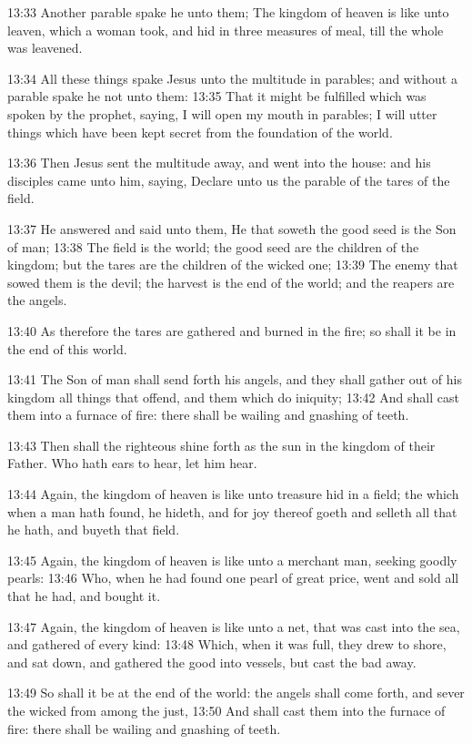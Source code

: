 13:33 Another parable spake he unto them; The kingdom of heaven is like unto leaven, which a woman took, and hid in three measures of meal, till the whole was leavened.

13:34 All these things spake Jesus unto the multitude in parables; and without a parable spake he not unto them: 13:35 That it might be fulfilled which was spoken by the prophet, saying, I will open my mouth in parables; I will utter things which have been kept secret from the foundation of the world.

13:36 Then Jesus sent the multitude away, and went into the house: and his disciples came unto him, saying, Declare unto us the parable of the tares of the field.

13:37 He answered and said unto them, He that soweth the good seed is the Son of man; 13:38 The field is the world; the good seed are the children of the kingdom; but the tares are the children of the wicked one; 13:39 The enemy that sowed them is the devil; the harvest is the end of the world; and the reapers are the angels.

13:40 As therefore the tares are gathered and burned in the fire; so shall it be in the end of this world.

13:41 The Son of man shall send forth his angels, and they shall gather out of his kingdom all things that offend, and them which do iniquity; 13:42 And shall cast them into a furnace of fire: there shall be wailing and gnashing of teeth.

13:43 Then shall the righteous shine forth as the sun in the kingdom of their Father. Who hath ears to hear, let him hear.

13:44 Again, the kingdom of heaven is like unto treasure hid in a field; the which when a man hath found, he hideth, and for joy thereof goeth and selleth all that he hath, and buyeth that field.

13:45 Again, the kingdom of heaven is like unto a merchant man, seeking goodly pearls: 13:46 Who, when he had found one pearl of great price, went and sold all that he had, and bought it.

13:47 Again, the kingdom of heaven is like unto a net, that was cast into the sea, and gathered of every kind: 13:48 Which, when it was full, they drew to shore, and sat down, and gathered the good into vessels, but cast the bad away.

13:49 So shall it be at the end of the world: the angels shall come forth, and sever the wicked from among the just, 13:50 And shall cast them into the furnace of fire: there shall be wailing and gnashing of teeth.

